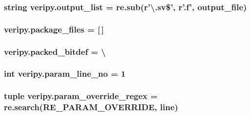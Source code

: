 \hypertarget{namespaceveripy_aa6ea69d7177eeedc80f2e1c1ff8b00f6}{
\subsubsection[{output\-\_\-list}]{\setlength{\rightskip}{0pt plus 5cm}string veripy.\-output\-\_\-list = re.\-sub(r'\textbackslash{}.sv\$', r'.{\bf f}', {\bf output\-\_\-file})}}\label{namespaceveripy_aa6ea69d7177eeedc80f2e1c1ff8b00f6}
\hypertarget{namespaceveripy_a5c1ad0dd8b61a07185f3e77b9912fad6}{
\subsubsection[{package\-\_\-files}]{\setlength{\rightskip}{0pt plus 5cm}veripy.\-package\-\_\-files = \mbox{[}$\,$\mbox{]}}}\label{namespaceveripy_a5c1ad0dd8b61a07185f3e77b9912fad6}
\hypertarget{namespaceveripy_a9f51ca42dc7f2f54aba501a90f9d804f}{
\subsubsection[{packed\-\_\-bitdef}]{\setlength{\rightskip}{0pt plus 5cm}veripy.\-packed\-\_\-bitdef = \textbackslash{}}}\label{namespaceveripy_a9f51ca42dc7f2f54aba501a90f9d804f}
\hypertarget{namespaceveripy_a980086a5e8762e72c5a2804ac1901c71}{
\subsubsection[{param\-\_\-line\-\_\-no}]{\setlength{\rightskip}{0pt plus 5cm}int veripy.\-param\-\_\-line\-\_\-no = 1}}\label{namespaceveripy_a980086a5e8762e72c5a2804ac1901c71}
\hypertarget{namespaceveripy_a4270387eaf219f4390fc832df8e279d4}{
\subsubsection[{param\-\_\-override\-\_\-regex}]{\setlength{\rightskip}{0pt plus 5cm}tuple veripy.\-param\-\_\-override\-\_\-regex = re.\-search(R\-E\-\_\-\-P\-A\-R\-A\-M\-\_\-\-O\-V\-E\-R\-R\-I\-D\-E, {\bf line})}}\label{namespaceveripy_a4270387eaf219f4390fc832df8e279d4}
